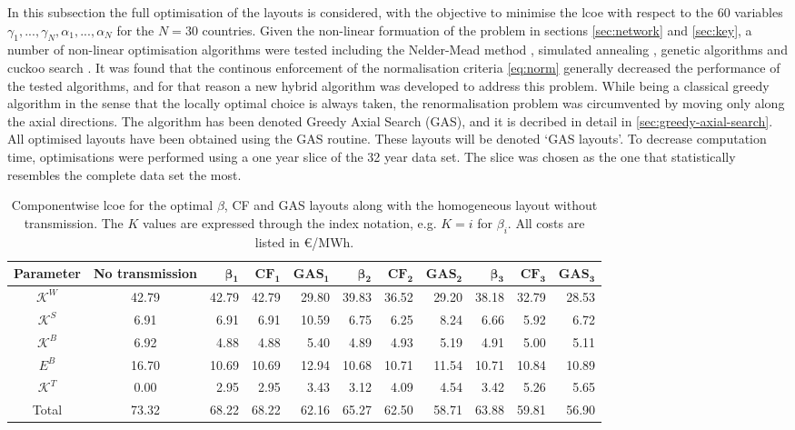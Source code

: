 \documentclass[a4paper, 5p, sort&compress]{elsarticle}%
\begin{document}
In this subsection the full optimisation of the layouts is considered,
with the objective to minimise the \gls{lcoe} with respect to the 60
variables $\gamma_{1}, ..., \gamma_{N}, \alpha_{1}, ..., \alpha_{N}$
for the $N=30$ countries.  Given the non-linear formuation of the
problem in sections \ref{sec:network} and \ref{sec:key}, a number of non-linear
optimisation algorithms were tested including the Nelder-Mead method
\cite{nelder}, simulated annealing \cite{sa}, genetic algorithms
\cite{ga} and cuckoo search \cite{cs}. It was found that the continous
enforcement of the normalisation criteria \cref{eq:norm} generally
decreased the performance of the tested algorithms, and for that
reason a new hybrid algorithm was developed to address this problem. While being
a classical greedy algorithm in the sense that the locally optimal
choice is always taken, the renormalisation problem was circumvented
by moving only along the axial directions. The algorithm has been
denoted Greedy Axial Search (GAS), and it is decribed in detail in
\cref{sec:greedy-axial-search}. All optimised layouts have been obtained using
the GAS routine. These layouts will be denoted `GAS layouts'. To
decrease computation time, optimisations were performed using a one
year slice of the 32 year data set. The slice was chosen as the one
that statistically resembles the complete data set the most.

\begin{table}[t!]
  \centering
  \caption{Componentwise \gls{lcoe} for the optimal $\beta$, CF and GAS layouts along with the
    homogeneous layout without transmission. The $K$ values are expressed through the index
    notation, e.g. $K = i$ for $\beta_{i}$. All costs are listed in \euro/MWh.}
  \label{tab:cost}
  \begin{tabular}{ccrrrrrrrrr}
    \toprule
    \textbf{Parameter} & \textbf{No transmission} & $\boldsymbol\beta\mathbf{_{1}}$ & $\mathbf{CF_{1}}$ & $\mathbf{GAS_{1}}$ & $\boldsymbol\beta\mathbf{_{2}}$ & $\mathbf{CF_{2}}$& $\mathbf{GAS_{2}}$ & $\boldsymbol\beta\mathbf{_{3}}$ & $\mathbf{CF_{3}}$ & $\mathbf{GAS_{3}}$ \\
    \midrule
    $\mathcal{K}^{W}$ & 42.79 & 42.79 & 42.79 & 29.80 & 39.83 & 36.52 & 29.20 & 38.18 & 32.79 & 28.53 \\ %
    $\mathcal{K}^{S}$ & 6.91 & 6.91 & 6.91 & 10.59 & 6.75 & 6.25 & 8.24 & 6.66 & 5.92 & 6.72 \\ %
    $\mathcal{K}^{B}$ & 6.92 & 4.88 & 4.88 & 5.40 & 4.89 & 4.93 & 5.19 & 4.91 & 5.00 & 5.11 \\ %
    $E^{B}$ & 16.70 & 10.69 & 10.69 & 12.94 & 10.68 & 10.71 & 11.54 & 10.71 & 10.84 & 10.89 \\ %
    $\mathcal{K}^{T}$ & 0.00 & 2.95 & 2.95 & 3.43 & 3.12 & 4.09 & 4.54 & 3.42 & 5.26 & 5.65 \\ %
    \midrule
    Total & 73.32 & 68.22 & 68.22 & 62.16 & 65.27 & 62.50 & 58.71 & 63.88 & 59.81 & 56.90 \\
    \bottomrule
  \end{tabular}
\end{table}
\end{document}
